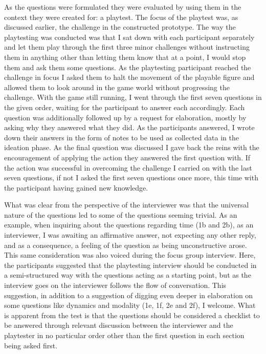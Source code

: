 As the questions were formulated they were evaluated by using them in the context they were created for: a playtest. The focus of the playtest was, as discussed earlier, the challenge in the constructed prototype. The way the playtesting was conducted was that I sat down with each participant separately and let them play through the first three minor challenges without instructing them in anything other than letting them know that at a point, I would stop them and ask them some questions. As the playtesting participant reached the challenge in focus I asked them to halt the movement of the playable figure and allowed them to look around in the game world without progressing the challenge. With the game still running, I went through the first seven questions in the given order, waiting for the participant to answer each accordingly. Each question was additionally followed up by a request for elaboration, mostly by asking why they answered what they did. As the participants answered, I wrote down their answers in the form of notes to be used as collected data in the ideation phase. As the final question was discussed I gave back the reins with the encouragement of applying the action they answered the first question with. If the action was successful in overcoming the challenge I carried on with the last seven questions, if not I asked the first seven questions once more, this time with the participant having gained new knowledge.

What was clear from the perspective of the interviewer was that the universal nature of the questions led to some of the questions seeming trivial. As an example, when inquiring about the questions regarding time (1b and 2b), as an interviewer, I was awaiting an affirmative answer, not expecting any other reply, and as a consequence, a feeling of the question as being unconstructive arose. This same consideration was also voiced during the focus group interview. Here, the participants suggested that the playtesting interview should be conducted in a semi-structured way with the questions acting as a starting point, but as the interview goes on the interviewer follows the flow of conversation. This suggestion, in addition to a suggestion of digging even deeper in elaboration on some questions like dynamics and modality (1e, 1f, 2e and 2f), I welcome. What is apparent from the test is that the questions should be considered a checklist to be answered through relevant discussion between the interviewer and the playtester in no particular order other than the first question in each section being asked first.

